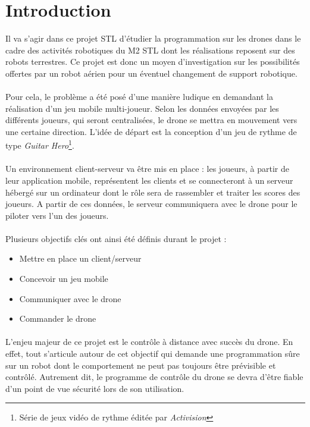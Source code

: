 \newpage
\section{Introduction}

Il va s'agir dans ce projet STL d'étudier la programmation sur les drones dans le cadre des activités robotiques du M2 STL dont les réalisations reposent sur des robots terrestres. Ce projet est donc un moyen d'investigation sur les possibilités offertes par un robot aérien pour un éventuel changement de support robotique.

\paragraph{}
Pour cela, le problème a été posé d'une manière ludique en demandant la réalisation d'un jeu mobile multi-joueur. Selon les données envoyées par les différents joueurs, qui seront centralisées, le drone se mettra en mouvement vers une certaine direction. L'idée de départ est la conception d'un jeu de rythme de type \textit{Guitar Hero}\footnote{Série de jeux vidéo de rythme éditée par \textit{Activision}}.

\paragraph{}
Un environnement client-serveur va être mis en place : les joueurs, à partir de leur application mobile, représentent les clients et se connecteront à un serveur hébergé sur un ordinateur dont le rôle sera de rassembler et traiter les scores des joueurs. A partir de ces données, le serveur communiquera avec le drone pour le piloter vers l'un des joueurs. 

\paragraph{}
Plusieurs objectifs clés ont ainsi été définis durant le projet :
\begin{itemize}
\item Mettre en place un client/serveur
\item Concevoir un jeu mobile
\item Communiquer avec le drone
\item Commander le drone
\end{itemize}

\paragraph{}
L'enjeu majeur de ce projet est le contrôle à distance avec succès du drone. En effet, tout s'articule autour de cet objectif qui demande une programmation sûre sur un robot dont le comportement ne peut pas toujours être prévisible et contrôlé. Autrement dit, le programme de contrôle du drone se devra d'être fiable d'un point de vue sécurité lors de son utilisation.